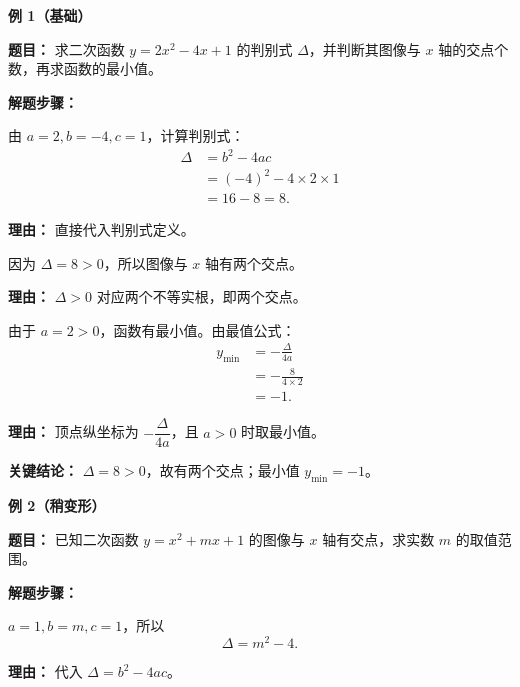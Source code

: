 \begin{examplebox}
	\textbf{\textcolor{CExample}{例 1（基础）}}

	\textbf{\textcolor{CExample}{题目：}} 求二次函数 $y=2x^2-4x+1$ 的判别式 $\Delta$，并判断其图像与 $x$ 轴的交点个数，再求函数的最小值。

	\textbf{\textcolor{CExample}{解题步骤：}}
	\begin{description}[style=nextline, leftmargin=2.8em, labelsep=0.5em, itemsep=0.45em]
		\item[\textbf{第一步（求判别式）：}]
		      由 $a=2,b=-4,c=1$，计算判别式：
		      \[
			      \begin{aligned}
				      \Delta
				       & =b^2-4ac                \\
				       & =(-4)^2-4\times2\times1 \\
				       & =16-8=8.
			      \end{aligned}
		      \]
		      \par\textbf{理由：} 直接代入判别式定义。

		\item[\textbf{第二步（判交点个数）：}]
		      因为 $\Delta=8>0$，所以图像与 $x$ 轴有两个交点。
		      \par\textbf{理由：} $\Delta>0$ 对应两个不等实根，即两个交点。

		\item[\textbf{第三步（求最小值）：}]
		      由于 $a=2>0$，函数有最小值。由最值公式：
		      \[
			      \begin{aligned}
				      y_{\min}
				       & =-\frac{\Delta}{4a}  \\
				       & =-\frac{8}{4\times2} \\
				       & =-1.
			      \end{aligned}
		      \]
		      \par\textbf{理由：} 顶点纵坐标为 $-\dfrac{\Delta}{4a}$，且 $a>0$ 时取最小值。
	\end{description}

	\textbf{\textcolor{CExample}{关键结论：}} $\Delta=8>0$，故有两个交点；最小值 $y_{\min}=-1$。

	\medskip
	\textbf{\textcolor{CExample}{例 2（稍变形）}}

	\textbf{\textcolor{CExample}{题目：}} 已知二次函数 $y=x^2+mx+1$ 的图像与 $x$ 轴有交点，求实数 $m$ 的取值范围。

	\textbf{\textcolor{CExample}{解题步骤：}}
	\begin{description}[style=nextline, leftmargin=2.8em, labelsep=0.5em, itemsep=0.45em]
		\item[\textbf{第一步（写判别式）：}]
		      $a=1,b=m,c=1$，所以
		      \[
			      \Delta=m^2-4.
		      \]
		      \par\textbf{理由：} 代入 $\Delta=b^2-4ac$。


\end{description}
\end{examplebox}
